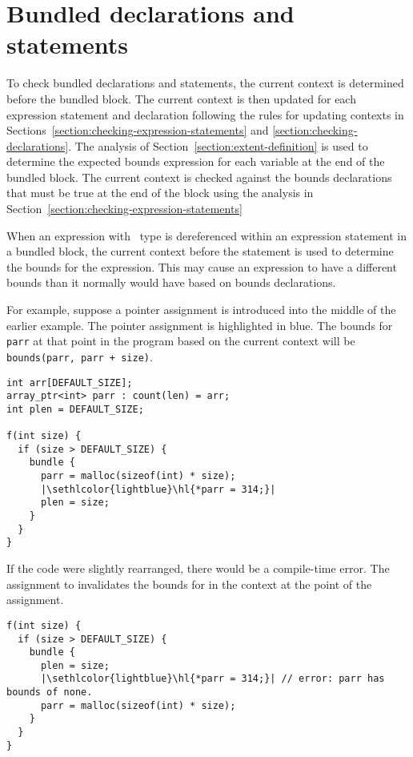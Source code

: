 \section{Bundled declarations and statements}
\label{section:checking-bundled}

To check bundled declarations and statements, the current context is
determined before the bundled block. The current context is then updated
for each expression statement and declaration following the rules for
updating contexts in Sections~\ref{section:checking-expression-statements} and 
\ref{section:checking-declarations}. The analysis of 
Section~\ref{section:extent-definition}
is used to determine the expected bounds expression for each variable at
the end of the bundled block. The current context is checked against the
bounds declarations that must be true at the end of the block using the
analysis in Section~\ref{section:checking-expression-statements}

When an expression with \arrayptr\ type is dereferenced within
an expression statement in a bundled block, the current context before
the statement is used to determine the bounds for the expression. This
may cause an expression to have a different bounds than it normally
would have based on bounds declarations.

For example, suppose a pointer assignment is introduced into the middle
of the earlier example. The pointer assignment is highlighted in blue.
The bounds for \lstinline|parr| at that point in the program based on the
current context will be \lstinline|bounds(parr, parr + size)|.

\begin{lstlisting}[escapechar=\|]
int arr[DEFAULT_SIZE];
array_ptr<int> parr : count(len) = arr;
int plen = DEFAULT_SIZE;

f(int size) {
  if (size > DEFAULT_SIZE) {
    bundle {
      parr = malloc(sizeof(int) * size);
      |\sethlcolor{lightblue}\hl{*parr = 314;}|
      plen = size;
    }
  }
}
\end{lstlisting}

If the code were slightly rearranged, there would be a compile-time
error. The assignment to  invalidates the bounds for
 in the context at the point of the assignment.

\begin{lstlisting}[escapechar=\|]
f(int size) {
  if (size > DEFAULT_SIZE) {
    bundle {
      plen = size;
      |\sethlcolor{lightblue}\hl{*parr = 314;}| // error: parr has bounds of none.
      parr = malloc(sizeof(int) * size);
    }
  }
}
\end{lstlisting}

